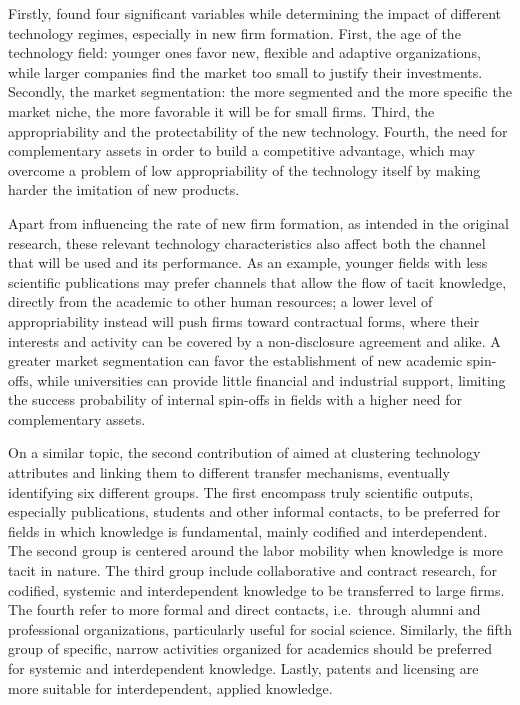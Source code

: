Firstly, \citet{Shane2001} found four significant variables while determining the impact of different technology regimes, especially in new firm formation. First, the age of the technology field: younger ones favor new, flexible and adaptive organizations, while larger companies find the market too small to justify their investments. Secondly, the market segmentation: the more segmented and the more specific the market niche, the more favorable it will be for small firms. Third, the appropriability and the protectability of the new technology. Fourth, the need for complementary assets in order to build a competitive advantage, which may overcome a problem of low appropriability of the technology itself by making harder the imitation of new products. 

Apart from influencing the rate of new firm formation, as intended in the original research, these relevant technology characteristics also affect both the channel that will be used and its performance. As an example, younger fields with less scientific publications may prefer channels that allow the flow of tacit knowledge, directly from the academic to other human resources; a lower level of appropriability instead will push firms toward contractual forms, where their interests and activity can be covered by a non-disclosure agreement and alike. A greater market segmentation can favor the establishment of new academic spin-offs, while universities can provide little financial and industrial support, limiting the success probability of internal spin-offs in fields with a higher need for complementary assets.

On a similar topic, the second contribution of \citet{Bekkers2008} aimed at clustering technology attributes and linking them to different transfer mechanisms, eventually identifying six different groups. The first encompass truly scientific outputs, especially publications, students and other informal contacts, to be preferred for fields in which knowledge is fundamental, mainly codified and interdependent. The second group is centered around the labor mobility when knowledge is more tacit in nature. The third group include collaborative and contract research, for codified, systemic and interdependent knowledge to be transferred to large firms. The fourth refer to more formal and direct contacts, i.e.\ through alumni and professional organizations, particularly useful for social science. Similarly, the fifth group of specific, narrow activities organized for academics should be preferred for systemic and interdependent knowledge. Lastly, patents and licensing are more suitable for interdependent, applied knowledge. 

